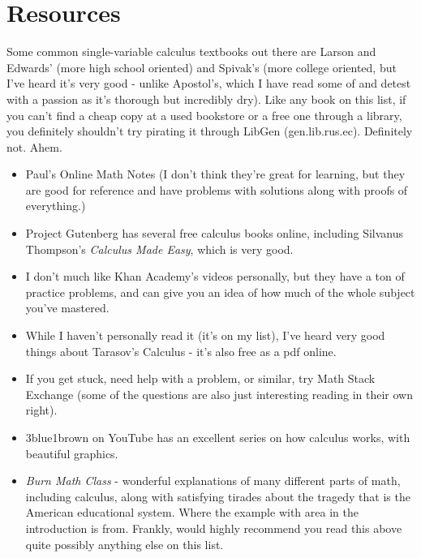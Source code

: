 \documentclass{article}
\begin{document}
\section{Resources}
Some common single-variable calculus textbooks out there are Larson and Edwards' (more high school oriented) and Spivak's (more college oriented, but I've heard it's very good - unlike Apostol's, which I have read some of and detest with a passion as it's thorough but incredibly dry). Like any book on this list, if you can't find a cheap copy at a used bookstore or a free one through a library, you definitely shouldn't try pirating it through LibGen (gen.lib.rus.ec). Definitely not. Ahem.
\begin{itemize}
    \item Paul's Online Math Notes (I don't think they're great for learning, but they are good for reference and have problems with solutions along with proofs of everything.)
    \item Project Gutenberg has several free calculus books online, including Silvanus Thompson's {\it Calculus Made Easy}, which is very good.
    \item I don't much like Khan Academy's videos personally, but they have a ton of practice problems, and can give you an idea of how much of the whole subject you've mastered.
    \item While I haven't personally read it (it's on my list), I've heard very good things about Tarasov's Calculus - it's also free as a pdf online.
    \item If you get stuck, need help with a problem, or similar, try Math Stack Exchange (some of the questions are also just interesting reading in their own right).
    \item 3blue1brown on YouTube has an excellent series on  how calculus works, with beautiful graphics.
    \item \textit{Burn Math Class} - wonderful explanations of many different parts of math, including calculus, along with satisfying tirades about the tragedy that is the American educational system. Where the example with area in the introduction is from. Frankly, would highly recommend you read this above quite possibly anything else on this list.
\end{itemize}
\end{document}
